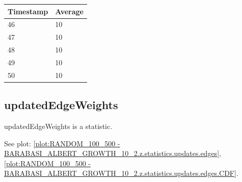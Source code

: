 \begin{tabular}{|l||l|}
\hline
	\textbf{Timestamp} & \textbf{Average} \\ \hline
	46 & 10 \\ \hline
	47 & 10 \\ \hline
	48 & 10 \\ \hline
	49 & 10 \\ \hline
	50 & 10 \\ \hline
\end{tabular}

\subsection{updatedEdgeWeights}
updatedEdgeWeights is a statistic.

See plot: \ref{plot:RANDOM_100_500 - BARABASI_ALBERT_GROWTH_10_2.z.statistics.updates.edges}, \ref{plot:RANDOM_100_500 - BARABASI_ALBERT_GROWTH_10_2.z.statistics.updates.edges.CDF}.

